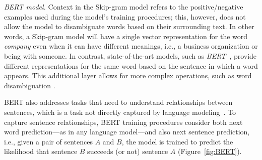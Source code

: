 








\medskip
\begin{hangparas}{.0in}{0}
     \textit{BERT model.} Context in the Skip-gram model refers to the positive/negative examples used during the model's training procedures; this, however, does not allow the model to disambiguate words based on their surrounding text. In other words, a Skip-gram model will have a single vector representation for the word \textit{company} even when it can have different meanings, i.e., a business organization or being with someone. In contrast, state-of-the-art models, such as \textit{BERT}~\cite{Devlin2018Bert}, provide different representations for the same word based on the sentence in which a word appears.
    This additional layer allows for more complex operations, such as word disambiguation .
\end{hangparas}



BERT also addresses tasks that need to understand relationships between sentences, which is a task not directly captured by language modeling~\cite{Devlin2018Bert}. 
To capture sentence relationships, BERT training procedures consider both next word prediction---as in any language model---and also next sentence prediction, i.e., given a pair of sentences $A$ and $B$, the model 
is trained to predict the likelihood that sentence $B$ succeeds (or not) sentence $A$ (Figure~\ref{fig:BERT}). 







